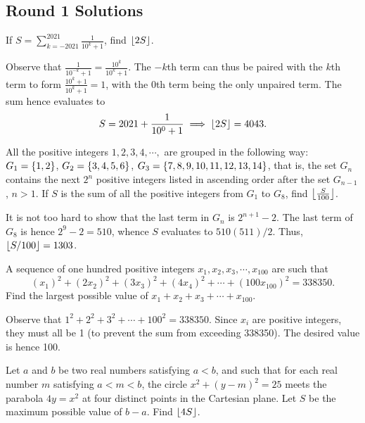 \subsection{Round 1 Solutions}\label{S::2022-O-1}


\begin{question}[4043]\label{A::2022-O-1-1}
    If $S = \displaystyle\sum_{k = -2021}^{2021} \frac{1}{10^k + 1}$, find $\left\lfloor 2S \right\rfloor$.
\end{question}

Observe that $\frac{1}{10^{-k} + 1} = \frac{10^k}{10^{k} + 1}$. The $-k$th term can thus be paired with the $k$th term to form $\frac{10^k + 1}{10^k + 1} = 1$, with the $0$th term being the only unpaired term. The sum hence evaluates to \[S = 2021 + \frac{1}{10^0 + 1} \implies \left\lfloor 2S \right\rfloor = 4043.\]

\begin{question}[1303]\label{A::2022-O-1-2}
    All the positive integers $1, 2, 3, 4, \cdots,$ are grouped in the following way: $G_1 = \left\lbrace 1, 2 \right\rbrace$, $G_2 = \left\lbrace 3, 4, 5, 6 \right\rbrace$, $G_3 = \left\lbrace 7, 8, 9, 10, 11, 12, 13, 14 \right\rbrace$, that is, the set $G_n$ contains the next $2^n$ positive integers listed in ascending order after the set $G_{n-1}$, $n > 1$. If $S$ is the sum of all the positive integers from $G_1$ to $G_8$, find $\left\lfloor \frac{S}{100} \right\rfloor$.
\end{question}

It is not too hard to show that the last term in $G_n$ is $2^{n+1} - 2$. The last term of $G_8$ is hence $2^9 - 2 = 510$, whence $S$ evaluates to $510(511)/2$. Thus, $\left\lfloor S/100 \right\rfloor = 1303$.

\begin{question}[100]\label{A::2022-O-1-3}
    A sequence of one hundred positive integers $x_1, x_2, x_3, \cdots, x_{100}$ are such that \[(x_1)^2 + (2x_2)^2 + (3x_3)^2 + (4x_4)^2 + \cdots + (100x_{100})^2 = 338350.\] Find the largest possible value of $x_1 + x_2 + x_3 + \cdots + x_{100}$.
\end{question}

Observe that $1^2 + 2^2 + 3^2 + \cdots + 100^2 = 338350$. Since $x_i$ are positive integers, they must all be 1 (to prevent the sum from exceeding 338350). The desired value is hence 100.

\clearpage
\begin{question}[9]\label{A::2022-O-1-4}
    Let $a$ and $b$ be two real numbers satisfying $a < b$, and such that for each real number $m$ satisfying $a < m < b$, the circle $x^2 + (y-m)^2 = 25$ meets the parabola $4y = x^2$ at four distinct points in the Cartesian plane. Let $S$ be the maximum possible value of $b-a$. Find $\left\lfloor 4S \right\rfloor$.
\end{question}

